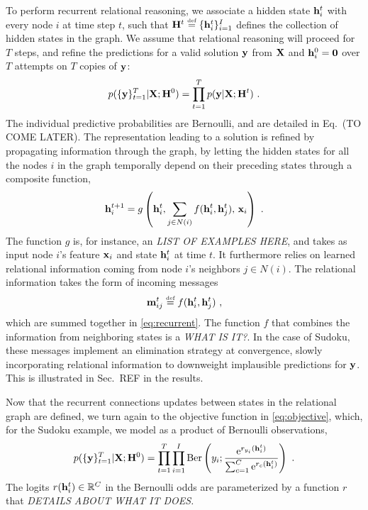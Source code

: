 To perform recurrent relational reasoning, we associate a hidden state
$\mathbf{h}_i^t$ with every node $i$ at time step $t$, such that
$\mathbf{H}^t \stackrel{\text{\tiny def}}{=} \{ \mathbf{h}_i^t\}_{i=1}^{I}$ defines the collection of hidden states in the graph. We assume that relational reasoning will proceed for $T$ steps,
and refine the predictions for a valid solution $\mathbf{y}$ from $\mathbf{X}$ and
$\mathbf{h}_i^0 = \mathbf{0}$ over $T$ attempts on $T$ copies of $\mathbf{y}$:
\begin{equation}
\label{eq:objective}
p( \{ \y \}_{t=1}^T | \X; \H^0) = \prod_{t=1}^T p(\y | \X; \H^t) \ .
\end{equation}
The individual predictive probabilities are Bernoulli, and are detailed in Eq.~(TO COME LATER).
The representation leading to a solution is refined by propagating information through the graph, by letting
the hidden states for all the nodes $i$ in the graph temporally depend on their preceding states through a composite function,
\begin{equation}
\label{eq:recurrent}
\mathbf{h}_{i}^{t+1} =
g \left( \mathbf{h}_i^{t}, \sum_{j \in N(i)} f( \mathbf{h}_i^{t}, \mathbf{h}_j^{t}), \, \mathbf{x}_i \right) \ .
\end{equation}
The function $g$ is, for instance, an \emph{LIST OF EXAMPLES HERE}, and takes as input node $i$'s feature $\mathbf{x}_i$ and state $\mathbf{h}_i^t$ at time $t$.
It furthermore relies on learned relational information coming from node $i$'s neighbors $j \in N(i)$. The relational information takes the form of
incoming messages
\[
\m_{ij}^t \defined f( \h_i^{t}, \h_j^{t}) \ ,
\]
which are summed together in \eqref{eq:recurrent}.
The function $f$ that combines the information from neighboring states is a \emph{WHAT IS IT?}.
In the case of Sudoku, these messages implement an
elimination strategy at convergence, slowly incorporating relational information to downweight implausible predictions for $\mathbf{y}$.
This is illustrated in Sec.~{REF} in the results.

Now that the recurrent connections updates between states in the relational graph are defined, we turn again to the objective function in \eqref{eq:objective}, which, for the Sudoku example, we model as a product of Bernoulli observations,
\[
p( \{ \y \}_{t=1}^T | \X; \H^0) = \prod_{t=1}^T \prod_{i=1}^{I} \textrm{Ber} \left(y_i ; \frac{\erm^{r_{y_i}(\h_i^t)}}{\sum_{c=1}^C \erm^{r_c(\h_i^t)}} \right) \ .
\]
The logits $r(\mathbf{h}_i^t) \in \mathbb{R}^C$ in the Bernoulli odds are parameterized
by a function $r$ that \emph{DETAILS ABOUT WHAT IT DOES.}